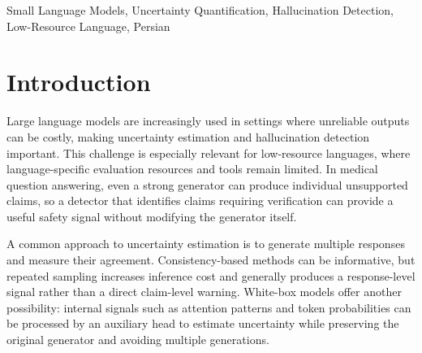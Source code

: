 \documentclass[conference]{IEEEtran}
\begin{document}
\begin{abstract}
Hallucination detection is particularly important for medical language models, but repeated-sampling approaches are expensive and existing uncertainty-head resources do not directly transfer to a new backbone and language. We adapt the LLM Uncertainty Head (LUH) framework to Aya-Expanse-8B-based Persian medical models, using Gaokerena-V and Gaokerena-R as two previously developed backbones. We first examine response variability on a 168-question Iranian medical entrance examination and observe substantially lower five-run consistency for Gaokerena-V than for Aya-Expanse-8B, whereas Gaokerena-R is comparable to Aya-Expanse-8B. We then construct two paired claim-level hallucination datasets directly in Persian, containing 1,600 responses for each backbone, and train lightweight claim-level heads on frozen backbone attention maps and token probabilities. On held-out test splits, the heads obtain PR-AUCs of 0.4820 and 0.4652, corresponding to 2.30 and 2.66 times their respective random baselines, and ROC-AUCs of 0.7852 and 0.7810. The heads require neither retrieval nor repeated sampling at inference time. These results provide an initial study of single-pass claim-level uncertainty estimation for Persian medical language models; the test splits are small and the labels are automatically generated.
\end{abstract}

\begin{IEEEkeywords}
Small Language Models, Uncertainty Quantification, Hallucination Detection, Low-Resource Language, Persian
\end{IEEEkeywords}

\section{Introduction}

Large language models are increasingly used in settings where unreliable outputs can be costly, making uncertainty estimation and hallucination detection important. This challenge is especially relevant for low-resource languages, where language-specific evaluation resources and tools remain limited. In medical question answering, even a strong generator can produce individual unsupported claims, so a detector that identifies claims requiring verification can provide a useful safety signal without modifying the generator itself.

A common approach to uncertainty estimation is to generate multiple responses and measure their agreement. Consistency-based methods can be informative, but repeated sampling increases inference cost and generally produces a response-level signal rather than a direct claim-level warning. White-box models offer another possibility: internal signals such as attention patterns and token probabilities can be processed by an auxiliary head to estimate uncertainty while preserving the original generator and avoiding multiple generations.
\end{document}
